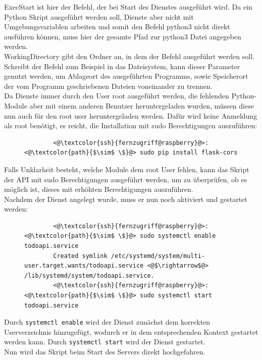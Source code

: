 \documentclass[a4paper, 11pt]{scrartcl}
\begin{document}
ExecStart ist hier der Befehl, der bei Start des Dienstes ausgeführt wird. Da ein Python Skript ausgeführt werden soll,
Dienste aber nicht mit Umgebungsvariablen arbeiten und somit den Befehl python3 nicht direkt ausführen können, muss hier
der gesamte Pfad zur python3 Datei angegeben werden.
\\
WorkingDirectory gibt den Ordner an, in dem der Befehl ausgeführt werden soll. Schreibt der Befehl zum Beispiel in das Dateisystem,
kann dieser Parameter genutzt werden, um Ablageort des ausgeführten Programms, sowie Speicherort der vom Programm geschriebenen
Dateien voneinander zu trennen.
\\
Da Dienste immer durch den User \glqq root\grqq{} ausgeführt werden, die fehlenden Python-Module aber mit einem anderen
Benutzer heruntergeladen wurden, müssen diese nun auch für den root user heruntergeladen werden. Dafür wird keine Anmeldung
als root benötigt, es reicht, die Installation mit sudo Berechtigungen auszuführen:
\begin{figure}[H]
    \begin{mdframed}[backgroundcolor=bbg]
        \begin{lstlisting}
        <@\textcolor{ssh}{fernzugriff@raspberry}@>:<@\textcolor{path}{$\sim$ \$}@> sudo pip install flask-cors
        \end{lstlisting}
    \end{mdframed}
    \label{lst:install_python_mods_sudo}
\end{figure}
Falls Unklarheit besteht, welche Module dem root User fehlen, kann das Skript der API mit sudo Berechtigungen ausgeführt werden, um zu überprüfen,
ob es möglich ist, dieses mit erhöhten Berechtigungen auszuführen.
\\
Nachdem der Dienst angelegt wurde, muss er nun noch aktiviert und gestartet werden:
\begin{figure}[H]
    \begin{mdframed}[backgroundcolor=bbg]
        \begin{lstlisting}
        <@\textcolor{ssh}{fernzugriff@raspberry}@>:<@\textcolor{path}{$\sim$ \$}@> sudo systemctl enable todoapi.service
        Created symlink /etc/systemd/system/multi-user.target.wants/todoapi.service <@$\rightarrow$@> /lib/systemd/system/todoapi.service.
        <@\textcolor{ssh}{fernzugriff@raspberry}@>:<@\textcolor{path}{$\sim$ \$}@> sudo systemctl start todoapi.service
        \end{lstlisting}
    \end{mdframed}
    \label{lst:enable_service}
\end{figure}
Durch \lstinline[basicstyle={\small\ttfamily\color{black}}]|systemctl enable| wird der Dienst zunächst dem korrekten Userverzeichnis
hinzugefügt, wodurch er in dem entsprechenden Kontext gestartet werden kann. Durch
\lstinline[basicstyle={\small\ttfamily\color{black}}]|systemctl start| wird der Dienst gestartet.
\\
Nun wird das Skript beim Start des Servers direkt hochgefahren.
\end{document}
